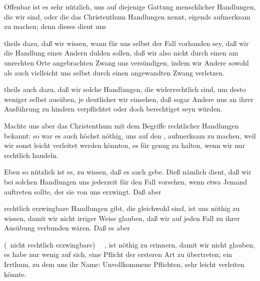 \begin{aufza}
\item Offenbar ist es sehr nützlich, uns auf diejenige Gattung menschlicher Handlungen, die wir  sind, oder die das Christenthum  Handlungen nennt, eigends aufmerksam zu machen; denn dieses dient uns
\begin{aufzb}
\item theils dazu, daß wir wissen, wann für uns selbst der Fall vorhanden sey, daß wir die Handlung eines Andern dulden sollen, daß wir also nicht durch einen am unrechten Orte angebrachten Zwang uns versündigen, indem wir Andere sowohl als auch vielleicht uns selbst durch einen angewandten Zwang verletzen.
\item theils auch dazu, daß wir solche Handlungen, die widerrechtlich sind, um desto weniger selbst ausüben, je deutlicher wir einsehen, daß sogar Andere uns an ihrer Ausführung zu hindern verpflichtet oder doch berechtiget seyn würden.
\end{aufzb}
\item Machte uns aber das Christenthum mit dem Begriffe rechtlicher Handlungen bekannt: so war es auch höchst nöthig, uns auf den , aufmerksam zu machen, weil wir sonst leicht verleitet werden könnten, es für genug zu halten, wenn wir nur rechtlich handeln.
\item Eben so nützlich ist es, zu wissen, daß es auch  gebe. Dieß nämlich dient, daß wir bei solchen Handlungen uns jederzeit für den Fall vorsehen, wenn etwa Jemand auftreten sollte, der sie von uns erzwingt. Daß aber
\begin{aufzb}
\item rechtlich erzwingbare Handlungen gibt, die gleichwohl  sind, ist uns nöthig zu wissen, damit wir nicht irriger Weise glauben, daß wir auf jeden Fall zu ihrer Ausübung verbunden wären. Daß es aber
\item {} (\dh\  nicht rechtlich erzwingbare) ~\ , ist nöthig zu erinnern, damit wir nicht glauben, es habe nur wenig auf sich, eine Pflicht der ersteren Art zu übertreten; ein Irrthum, zu dem uns ihr Name: Unvollkommene Pflichten, sehr leicht verleiten könnte.
\end{aufzb}
\end{aufza}

